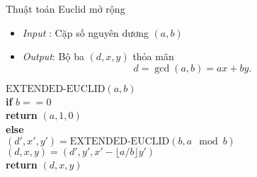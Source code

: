 


\begin{frame}{Thuật toán Euclid mở rộng}
  \begin{itemize}
  \item \textit{Input} : Cặp số nguyên dương $(a,b)$
  \item \textit{Output}: Bộ ba $(d,x,y)$ thỏa mãn 
    $$
    d = \gcd (a,b) = ax + by. 
    $$ 
  \end{itemize}
    \begin{block}{}
     $\text{EXTENDED-EUCLID} (a,b)$ \\
     \qquad \textbf{if} $b == 0$ \\
     \qquad \qquad \textbf{return } $(a,1,0)$\\
     \qquad \textbf{else  } \\
     \qquad \qquad $(d',x',y') = \text{EXTENDED-EUCLID} (b,a \mod b)$\\     
     \qquad \qquad $(d,x,y) = (d',y',x' - \lfloor a/b\rfloor y' )$\\
     \qquad \qquad \textbf{ return } $(d,x,y)$     
  \end{block}
\end{frame}

